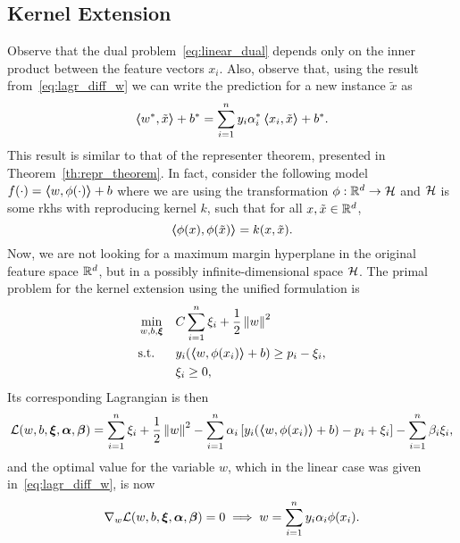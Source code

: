 \subsection{Kernel Extension}
Observe that the dual problem~\eqref{eq:linear_dual} depends only on the inner product between the feature vectors $x_i$. Also, observe that, using the result from~\eqref{eq:lagr_diff_w} we can write the prediction for a new instance $\tilde{x}$ as 
\begin{equation}
    \nonumber
    \bm{\left\langle} {w}^*, \tilde{x} \bm{\right\rangle} + {b}^* = \sum_{i = 1}^n y_i {\alpha}^*_i \bm{\left\langle} x_i, \tilde{x} \bm{\right\rangle} + {b}^* .
\end{equation} 
This result is similar to that of the representer theorem, presented in Theorem~\ref{th:repr_theorem}.
In fact, consider the following model 
$f(\cdot) = \bm{\left\langle} w, \phi(\cdot) \bm{\right\rangle} + b$
where we are using the transformation $\phi: \mathbb{R}^d \to \mathcal{H}$ and $\mathcal{H}$ is some \acrshort{rkhs} with reproducing kernel $k$, such that for all $x, \tilde{x} \in \mathbb{R}^d$, 
$$ \bm{\left\langle} \phi(x), \phi(\tilde{x}) \bm{\right\rangle} = k(x, \tilde{x}) .$$ 
Now, we are not looking for a maximum margin hyperplane in the original feature space $\mathbb{R}^d$, but in a possibly infinite-dimensional space $\mathcal{H}$.
The primal problem for the kernel extension using the unified formulation is
\begin{equation}
    \label{eq:kernel_primal}
    \begin{aligned}
        &\min_{w, b, \fv{\xi}} & & C \sum_{i=1}^\nsamples \xi_i + \frac{1}{2} \norm{w}^2 \\
        & \text{s.t.} & & y_i (\dotp{w}{\phi(x_i)} + b) \geq p_i - \xi_i , \\
        & & & \xi_i \geq 0 ,      
    \end{aligned}  
\end{equation}
Its corresponding Lagrangian is then 
\begin{equation}
    \nonumber
    \mathcal{L}(w, b, \bm{\xi}, \bm{\alpha}, \bm{\beta}) = \sum_{i=1}^n \xi_i + \frac{1}{2} \left\lVert w\right\rVert^2 - \sum_{i=1}^n \alpha_i \left[ y_i (\bm{\left\langle} w, \phi(x_i) \bm{\right\rangle} + b) - p_i + \xi_i \right] - \sum_{i=1}^n \beta_i \xi_i ,
\end{equation}
and the optimal value for the variable $w$, which in the linear case was given in~\ref{eq:lagr_diff_w}, is now
\begin{equation}\label{eq:lagr_diff_w_kernel}
    \nabla_w \lagr(w, b, \fv{\xi}, \fv{\alpha}, \fv{\beta}) = 0 \implies w = \sum_{i=1}^\nsamples y_i \alpha_i \phi(x_i) .
\end{equation}

